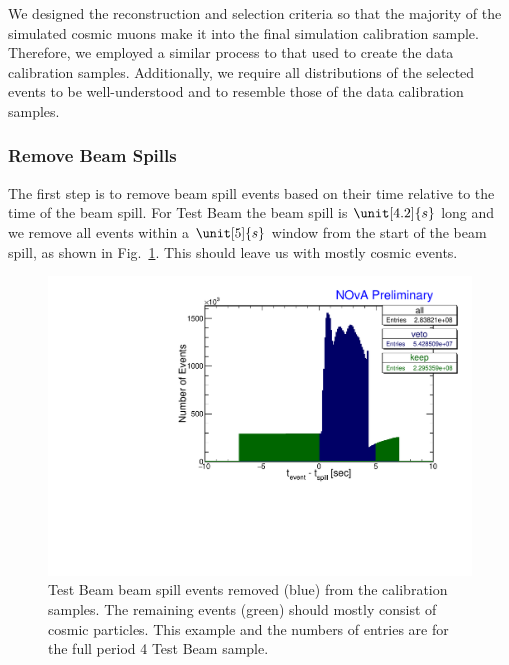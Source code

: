 We designed the reconstruction and selection criteria so that the majority of the simulated cosmic muons make it into the final simulation calibration sample. Therefore, we employed a similar process to that used to create the data calibration samples. Additionally, we require all distributions of the selected events to be well-understood and to resemble those of the data calibration samples.

\subsubsection*{Remove Beam Spills}
The first step is to remove beam spill events based on their time relative to the time of the beam spill. For Test Beam the beam spill is $\unit[4.2]{s}$ long and we remove all events within a $\unit[5]{s}$ window from the start of the beam spill, as shown in Fig.~\ref{fig:RemoveTBSpills}. This should leave us with mostly cosmic events.

\begin{figure}[hbtp]
\centering
\includegraphics[width=\textwidth]{Plots/TBCalibration/RemoveTBSpills.pdf}
\caption[Removing Test Beam beam spill]{Test Beam beam spill events removed (blue) from the calibration samples. The remaining events (green) should mostly consist of cosmic particles. This example and the numbers of entries are for the full period 4 Test Beam sample.}
\label{fig:RemoveTBSpills}
\end{figure}

